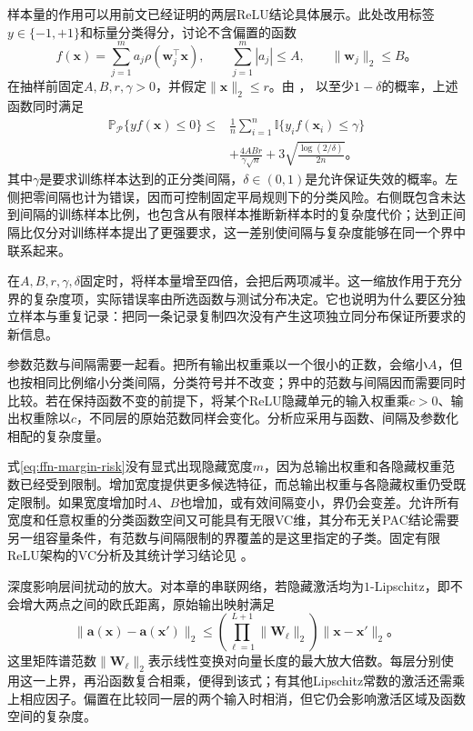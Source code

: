 样本量的作用可以用前文已经证明的两层ReLU结论具体展示。此处改用标签$y\in\{-1,+1\}$和标量分类得分，讨论不含偏置的函数
\[
  f(\bm{x})=\sum_{j=1}^{m}a_j\rho(\bm{w}_j^{\top}\bm{x}),
  \qquad \sum_{j=1}^{m}|a_j|\leq A,
  \qquad \lVert\bm{w}_j\rVert_2\leq B\text{。}
\]
在抽样前固定$A,B,r,\gamma>0$，并假定$\lVert\bm{x}\rVert_2\leq r$。由
，
以至少$1-\delta$的概率，上述函数同时满足
\begin{equation}
  \begin{aligned}
    \mathbb{P}_{\mathcal{P}}\{yf(\bm{x})\leq0\}
    \leq{}&\frac1n\sum_{i=1}^{n}
      \mathbb{I}\{y_i f(\bm{x}_i)\leq\gamma\}\\
    &+\frac{4ABr}{\gamma\sqrt n}
      +3\sqrt{\frac{\log(2/\delta)}{2n}}\text{。}
  \end{aligned}
  \label{eq:ffn-margin-risk}
\end{equation}
其中$\gamma$是要求训练样本达到的正分类间隔，$\delta\in(0,1)$是允许保证失效的概率。左侧把零间隔也计为错误，因而可控制固定平局规则下的分类风险。右侧既包含未达到间隔的训练样本比例，也包含从有限样本推断新样本时的复杂度代价；达到正间隔比仅分对训练样本提出了更强要求，这一差别使间隔与复杂度能够在同一个界中联系起来。

在$A,B,r,\gamma,\delta$固定时，将样本量增至四倍，会把后两项减半。这一缩放作用于充分界的复杂度项，实际错误率由所选函数与测试分布决定。它也说明为什么要区分独立样本与重复记录：把同一条记录复制四次没有产生这项独立同分布保证所要求的新信息。

参数范数与间隔需要一起看。把所有输出权重乘以一个很小的正数，会缩小$A$，但也按相同比例缩小分类间隔，分类符号并不改变；界中的范数与间隔因而需要同时比较。若在保持函数不变的前提下，将某个ReLU隐藏单元的输入权重乘$c>0$、输出权重除以$c$，不同层的原始范数同样会变化。分析应采用与函数、间隔及参数化相配的复杂度量。

式\eqref{eq:ffn-margin-risk}没有显式出现隐藏宽度$m$，因为总输出权重和各隐藏权重范数已经受到限制。增加宽度提供更多候选特征，而总输出权重与各隐藏权重仍受既定限制。如果宽度增加时$A$、$B$也增加，或有效间隔变小，界仍会变差。允许所有宽度和任意权重的分类函数空间又可能具有无限VC维，其分布无关PAC结论需要另一组容量条件，有范数与间隔限制的界覆盖的是这里指定的子类。固定有限ReLU架构的VC分析及其统计学习结论见
。

深度影响层间扰动的放大。对本章的串联网络，若隐藏激活均为$1$-Lipschitz，即不会增大两点之间的欧氏距离，原始输出映射满足
\begin{equation}
  \lVert\bm{a}(\bm{x})-\bm{a}(\bm{x}')\rVert_2
  \leq
  \left(\prod_{\ell=1}^{L+1}\lVert\bm{W}_\ell\rVert_2\right)
  \lVert\bm{x}-\bm{x}'\rVert_2\text{。}
  \label{eq:ffn-input-sensitivity}
\end{equation}
这里矩阵谱范数$\lVert\bm{W}_\ell\rVert_2$表示线性变换对向量长度的最大放大倍数。每层分别使用这一上界，再沿函数复合相乘，便得到该式；有其他Lipschitz常数的激活还需乘上相应因子。偏置在比较同一层的两个输入时相消，但它仍会影响激活区域及函数空间的复杂度。


